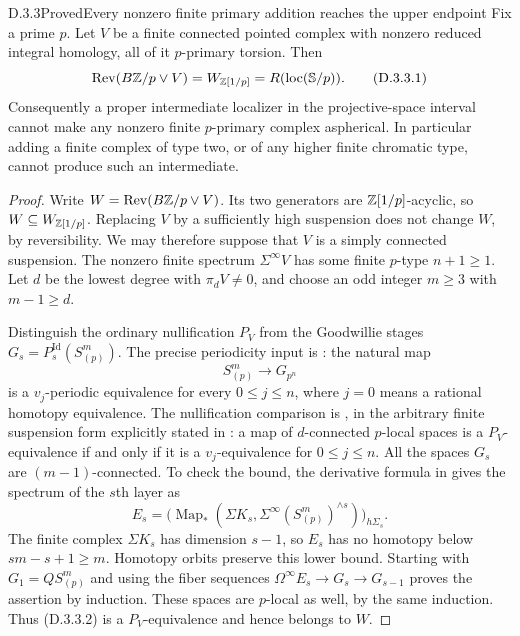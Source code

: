 \begin{claim}{D.3.3}{Proved}{Every nonzero finite primary addition reaches the upper endpoint}
Fix a prime $p$. Let $V$ be a finite connected pointed complex with
nonzero reduced integral homology, all of it $p$-primary torsion.
Then
\[
 \operatorname{Rev}(B\mathbb Z/p\vee V)
       =W_{\mathbb Z[1/p]}=R(\operatorname{loc}(\mathbb S/p)).
 \tag{D.3.3.1}
\]
Consequently a proper intermediate localizer in the projective-space
interval cannot make any nonzero finite $p$-primary complex aspherical.
In particular adding a finite complex of type two, or of any higher
finite chromatic type, cannot produce such an intermediate.
\end{claim}
\begin{proof}
Write $W=\operatorname{Rev}(B\mathbb Z/p\vee V)$. Its two generators
are $\mathbb Z[1/p]$-acyclic, so $W\subseteq W_{\mathbb Z[1/p]}$.
Replacing $V$ by a sufficiently high suspension does not change
$W$, by reversibility. We may therefore suppose that $V$ is a
simply connected suspension. The nonzero finite spectrum
$\Sigma^\infty V$ has some finite $p$-type $n+1\geq1$.
Let $d$ be the lowest degree with $\pi_dV\ne0$, and choose an
odd integer $m\geq3$ with $m-1\geq d$.

Distinguish the ordinary nullification $P_V$ from the Goodwillie
stages $G_s=P_s^{\mathrm{Id}}(S^m_{(p)})$.
The precise periodicity input is
\cite[Theorem~4.1]{EH5AroneMahowald1999}: the natural map
\[
                 S^m_{(p)}\longrightarrow G_{p^n}
 \tag{D.3.3.2}
\]
is a $v_j$-periodic equivalence for every $0\leq j\leq n$,
where $j=0$ means a rational homotopy equivalence.
The nullification comparison is
\cite[Corollary~4.8]{EH5Bousfield2001}, in the arbitrary finite
suspension form explicitly stated in
\cite[Theorem~3.1]{EH5BarthelHeutsMeier2021}: a map of
$d$-connected $p$-local spaces is a $P_V$-equivalence if and
only if it is a $v_j$-equivalence for $0\leq j\leq n$.
All the spaces $G_s$ are $(m-1)$-connected. To check the bound,
the derivative formula in
\cite[Theorem~2.1]{EH5AroneMahowald1999} gives the spectrum of
the $s$th layer as
\[
 E_s=\bigl(\operatorname{Map}_*(\Sigma K_s,
          \Sigma^\infty(S^m_{(p)})^{\wedge s})\bigr)_{h\Sigma_s}.
\]
The finite complex $\Sigma K_s$ has dimension $s-1$, so $E_s$
has no homotopy below $sm-s+1\geq m$. Homotopy orbits preserve
this lower bound. Starting with $G_1=QS^m_{(p)}$ and using
the fiber sequences $\Omega^\infty E_s\to G_s\to G_{s-1}$
proves the assertion by induction. These spaces are $p$-local
as well, by the same induction. Thus (D.3.3.2) is a
$P_V$-equivalence and hence belongs to $W$.


\end{proof}
